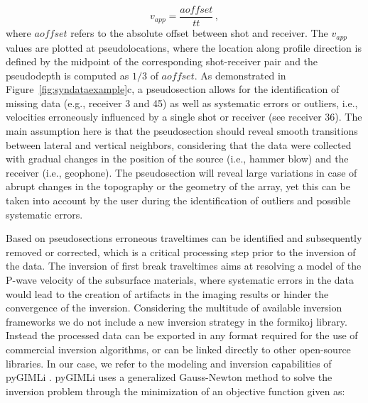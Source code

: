 \documentclass[a4paper,fleqn]{cas-sc}
\begin{document}
\begin{equation}
	v_{app}=\frac{aoffset}{tt}\,,
	\label{eq:vapp}
\end{equation}
where $aoffset$ refers to the absolute offset between shot and receiver. The $v_{app}$ values are plotted at pseudolocations, where the location along profile direction is defined by the midpoint of the corresponding shot-receiver pair and the pseudodepth is computed as $1/3$ of $aoffset$.
As demonstrated in Figure~\ref{fig:syndataexample}c, a pseudosection allows for the identification of missing data (e.g., receiver 3 and 45) as well as systematic errors or outliers, i.e., velocities erroneously influenced by a single shot or receiver (see receiver 36). The main assumption here is that the pseudosection should reveal smooth transitions between lateral and vertical neighbors, considering that the data were collected with gradual changes in the position of the source (i.e., hammer blow) and the receiver (i.e., geophone). The pseudosection will reveal large variations in case of abrupt changes in the topography or the geometry of the array, yet this can be taken into account by the user during the identification of outliers and possible systematic errors.

Based on pseudosections erroneous traveltimes can be identified and subsequently removed or corrected, which is a critical processing step prior to the inversion of the data. The inversion of first break traveltimes aims at resolving a model of the P-wave velocity of the subsurface materials, where systematic errors in the data would lead to the creation of artifacts in the imaging results or hinder the convergence of the inversion.
Considering the multitude of available inversion frameworks we do not include a new inversion strategy in the formikoj library. Instead the processed data can be exported in any format required for the use of commercial inversion algorithms, or can be linked directly to other open-source libraries. In our case, we refer to the modeling and inversion capabilities of pyGIMLi \citep{ruecker2017}.
pyGIMLi uses a generalized Gauss-Newton method to solve the inversion problem through the minimization of an objective function given as:
\end{document}
